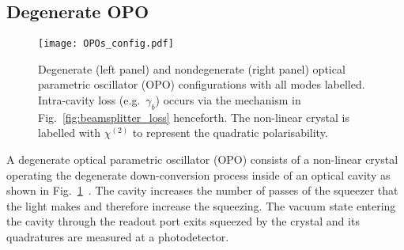 \subsection{Degenerate OPO}

\begin{figure}
	\centering
	\texttt{[image: OPOs\_config.pdf]}
	\caption{Degenerate (left panel) and nondegenerate (right panel) optical parametric oscillator (OPO) configurations with all modes labelled. Intra-cavity loss (e.g.\ $\gamma_b$) occurs via the mechanism in Fig.~\ref{fig:beamsplitter_loss} henceforth. The non-linear crystal is labelled with $\chi^{(2)}$ to represent the quadratic polarisability. %
	}
	\label{fig:OPOs_config}
\end{figure}

A degenerate optical parametric oscillator (OPO) consists of a non-linear crystal operating the degenerate down-conversion process inside of an optical cavity as shown in Fig.~\ref{fig:OPOs_config}~\cite{}. The cavity increases the number of passes of the squeezer that the light makes and therefore increase the squeezing. The vacuum state entering the cavity through the readout port exits squeezed by the crystal and its quadratures are measured at a photodetector.

